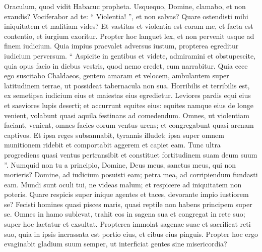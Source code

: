 \begin{biblechapter}
 \verse Oraculum, quod vidit Habacuc propheta.
 \verse Usquequo, Domine, clamabo,
 et non exaudis?
 Vociferabor ad te: “ Violentia! ”,
 et non salvas?
 \verse Quare ostendisti mihi iniquitatem
 et malitiam vides?
 Et vastitas et violentia est coram me,
 et facta est contentio, et iurgium exoritur.
 \verse Propter hoc languet lex,
 et non pervenit usque ad finem iudicium.
 Quia impius praevalet adversus iustum,
 propterea egreditur iudicium perversum.
 \verse “ Aspicite in gentibus et videte,
 admiramini et obstupescite,
 quia opus facio in diebus vestris,
 quod nemo credet, cum narrabitur.
 \verse Quia ecce ego suscitabo Chaldaeos,
 gentem amaram et velocem,
 ambulantem super latitudinem terrae,
 ut possideat tabernacula non sua.
 \verse Horribilis et terribilis est,
 ex semetipsa iudicium eius
 et maiestas eius egredietur.
 \verse Leviores pardis equi eius
 et saeviores lupis deserti;
 et accurrunt equites eius:
 equites namque eius de longe venient,
 volabunt quasi aquila
 festinans ad comedendum.
 \verse Omnes, ut violentiam faciant, venient,
 omnes facies eorum ventus urens;
 et congregabunt quasi arenam captivos.
 \verse Et ipsa reges subsannabit,
 tyrannis illudet;
 ipsa super omnem munitionem ridebit
 et comportabit aggerem et capiet eam.
 \verse Tunc ultra progrediens quasi ventus pertransibit
 et constituet fortitudinem suam deum suum ”.
 \verse Numquid non tu a principio, Domine,
 Deus meus, sanctus meus,
 qui non morieris?
 Domine, ad iudicium posuisti eam; petra mea, ad corripiendum fundasti eam.
 \verse Mundi sunt oculi tui, ne videas malum;
 et respicere ad iniquitatem non poteris.
 Quare respicis super inique agentes et taces, devorante impio iustiorem se?
 \verse Fecisti homines quasi pisces maris,
 quasi reptile non habens principem super se.
 \verse Omnes in hamo sublevat,
 trahit eos in sagena sua
 et congregat in rete suo;
 super hoc laetatur et exsultat.
 \verse Propterea immolat sagenae suae
 et sacrificat reti suo,
 quia in ipsis incrassata est portio eius,
 et cibus eius pinguis.
 \verse Propter hoc ergo evaginabit gladium suum semper,
 ut interficiat gentes sine misericordia?
 

\end{biblechapter}
